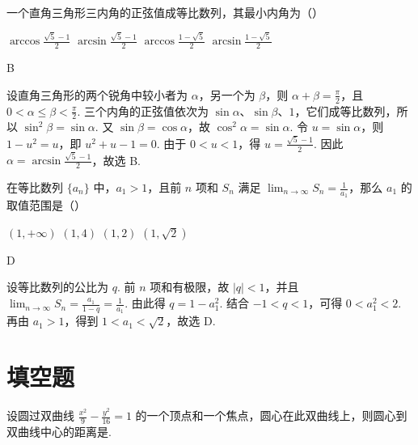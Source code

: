 \begin{problem}
一个直角三角形三内角的正弦值成等比数列，其最小内角为（\quad）

\choices
    {\(\arccos \frac{\sqrt{5} - 1}{2}\)}
    {\(\arcsin \frac{\sqrt{5} - 1}{2}\)}
    {\(\arccos \frac{1 - \sqrt{5}}{2}\)}
    {\(\arcsin \frac{1 - \sqrt{5}}{2}\)}
\end{problem}

\begin{answer}
B
\end{answer}

\begin{solution}
设直角三角形的两个锐角中较小者为 \(\alpha\)，另一个为 \(\beta\)，则 \(\alpha+\beta=\frac{\pi}{2}\)，且
\(0<\alpha\leq\beta<\frac{\pi}{2}\). 三个内角的正弦值依次为 \(\sin\alpha\)、\(\sin\beta\)、\(1\)，它们成等比数列，所以
\(\sin^{2}\beta=\sin\alpha\). 又 \(\sin\beta=\cos\alpha\)，故 \(\cos^{2}\alpha=\sin\alpha\). 令 \(u=\sin\alpha\)，则
\(1-u^{2}=u\)，即 \(u^{2}+u-1=0\). 由于 \(0<u<1\)，得 \(u=\frac{\sqrt{5}-1}{2}\). 因此
\(\alpha=\arcsin\frac{\sqrt{5}-1}{2}\)，故选 B.
\end{solution}

\begin{problem}
在等比数列 \(\{a_{n}\}\) 中，\(a_{1}>1\)，且前 \(n\) 项和 \(S_{n}\) 满足 \(\displaystyle\lim_{n\to\infty} S_{n}=\frac{1}{a_{1}}\)，那么 \(a_{1}\) 的取值范围是（\quad）

\choices
    {\((1, +\infty)\)}
    {\((1,4)\)}
    {\((1,2)\)}
    {\((1,\sqrt{2})\)}
\end{problem}

\begin{answer}
D
\end{answer}

\begin{solution}
设等比数列的公比为 \(q\). 前 \(n\) 项和有极限，故 \(|q|<1\)，并且
\(\lim_{n\to\infty}S_{n}=\frac{a_{1}}{1-q}=\frac{1}{a_{1}}\). 由此得
\(q=1-a_{1}^{2}\). 结合 \(-1<q<1\)，可得 \(0<a_{1}^{2}<2\). 再由 \(a_{1}>1\)，得到
\(1<a_{1}<\sqrt{2}\)，故选 D.
\end{solution}

\section{填空题}

\begin{problem}
设圆过双曲线 \(\frac{x^{2}}{9} - \frac{y^{2}}{16} = 1\) 的一个顶点和一个焦点，圆心在此双曲线上，则圆心到双曲线中心的距离是\fillinblank{}.
\end{problem}

